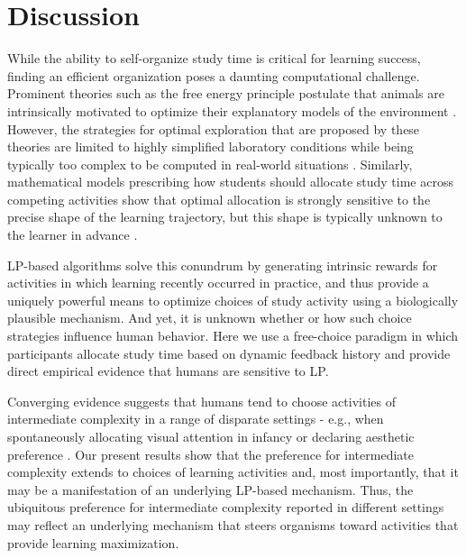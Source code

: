 \section{Discussion}
While the ability to self-organize study time is critical for learning success, finding an efficient organization poses a daunting computational challenge. Prominent theories such as the free energy principle postulate that animals are intrinsically motivated to optimize their explanatory models of the environment \parencite{collins2014human,schwartenbeck_computational_2019}. However, the strategies for optimal exploration that are proposed by these theories are limited to highly simplified laboratory conditions while being typically too complex to be computed in real-world situations \parencite{cohen_should_2007}. Similarly, mathematical models prescribing how students should allocate study time across competing activities show that optimal allocation is strongly sensitive to the precise shape of the learning trajectory, but this shape is typically unknown to the learner in advance \parencite{son_metacognitive_2006}. 

\ac{LP}-based algorithms solve this conundrum by generating intrinsic rewards for activities in which  learning recently occurred in practice, and thus provide a uniquely powerful means to optimize choices of study activity using a biologically plausible  mechanism. And yet, it is unknown whether or how such choice strategies influence human behavior. Here we use a free-choice paradigm in which participants allocate study time based on dynamic feedback history and provide direct empirical evidence that humans are sensitive to \ac{LP}.

Converging evidence suggests that humans tend to choose activities of intermediate complexity in a range of disparate settings - e.g., when spontaneously allocating visual attention in infancy \parencite{kidd_goldilocks_2012} or declaring aesthetic preference \parencite{tsutsui_complexity_2011,gold_predictability_2019,sauve2019information}. Our present results show that the preference for intermediate complexity extends to choices of learning activities \parencite[see also][]{baranes_effects_2014} and, most importantly, that it may be a manifestation of an underlying \ac{LP}-based mechanism. Thus, the ubiquitous preference for intermediate complexity reported in different settings may reflect an underlying mechanism that steers organisms toward activities that provide learning maximization.

